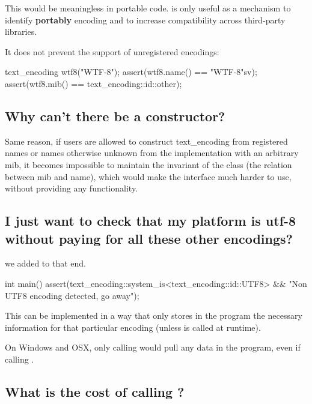 \documentclass{wg21}
\begin{document}
This would be meaningless in portable code.  is only useful as a mechanism to identify \textbf{portably} encoding and to increase compatibility across third-party libraries.

It does not prevent the support of unregistered encodings:

\begin{colorblock}
    text_encoding wtf8("WTF-8");
    assert(wtf8.name() == "WTF-8"sv);
    assert(wtf8.mib() == text_encoding::id::other);
\end{colorblock}


\subsection{Why can't there be a  constructor?}

Same reason, if users are allowed to construct text_encoding from registered names or names otherwise
unknown from the implementation with an arbitrary mib, it becomes impossible to maintain the invariant of the class
(the relation between mib and name), which would make the interface much harder to use, without providing
any functionality.

\subsection{I just want to check that my platform is utf-8 without paying for all these other encodings?}

we added  to that end.

\begin{colorblock}[style=MY]
    int main() {
        assert(text_encoding::system_is<text_encoding::id::UTF8>
                  && "Non UTF8 encoding detected, go away");
    }
\end{colorblock}


This can be implemented in a way that only stores in the program the necessary information for that particular encoding (unless  is called at runtime).

On Windows and OSX, only calling  would pull any data in the program, even if calling .


\subsection{What is the cost of calling ?}
\end{document}
